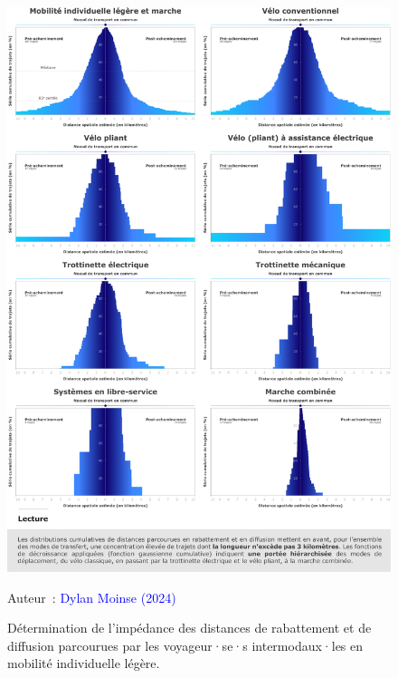\begin{refsegment}
    \begin{figure}[h!]\vspace*{4pt}
        \caption{Détermination de l'impédance des distances de rabattement et de diffusion parcourues par les voyageur·se·s intermodaux·les en mobilité individuelle légère.}
        \label{fig-chap5:impedance-distances}
        \centerline{\includegraphics[width=1\columnwidth]{src/Figures/Chap-5/FR_Distances_Impedance.pdf}}
        \vspace{5pt}
        \begin{flushright}\scriptsize{
        Auteur~: \textcolor{blue}{Dylan Moinse (2024)}
        }\end{flushright}
    \end{figure}


\end{refsegment}
